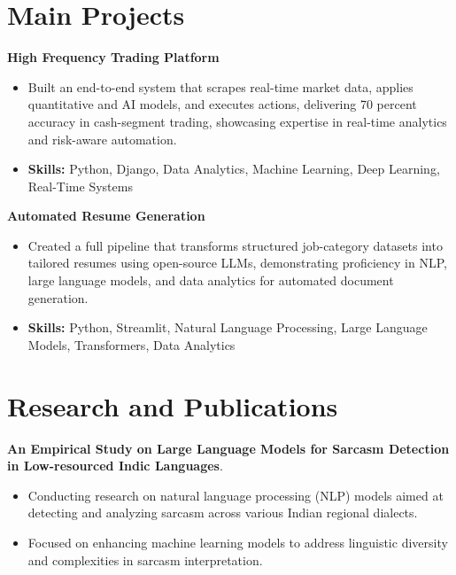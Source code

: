 \documentclass[a4paper,11pt]{article}
\begin{document}
\section{\textbf{Main Projects}}

\vspace{1mm}
  \textbf{High Frequency Trading Platform  }
\vspace{-1.5mm} %
\begin{itemize}
  \item Built an end-to-end system that scrapes real-time market data, applies quantitative and AI models, and executes actions, delivering 70 percent accuracy in cash-segment trading, showcasing expertise in real-time analytics and risk-aware automation.
\vspace{-3mm}
  \item \textbf{Skills:} Python, Django, Data Analytics, Machine Learning, Deep Learning, Real-Time Systems
\end{itemize}


\vspace{1mm}
   \textbf{Automated Resume Generation }
\vspace{-1.5mm} %
\begin{itemize}
  \item Created a full pipeline that transforms structured job-category datasets into tailored resumes using open-source LLMs, demonstrating proficiency in NLP, large language models, and data analytics for automated document generation.
\vspace{-3mm}
  \item \textbf{Skills:} Python, Streamlit, Natural Language Processing, Large Language Models, Transformers, Data Analytics
\end{itemize}



\section{\textbf{Research and Publications} \hfill }
\vspace{1mm}
  \textbf{An Empirical Study on Large Language Models for Sarcasm Detection in Low-resourced Indic Languages}.
\vspace{-1mm} %
\begin{itemize}
  \item Conducting research on natural language processing (NLP) models aimed at detecting and analyzing sarcasm across various Indian regional dialects.
\vspace{-3mm}
  \item Focused on enhancing machine learning models to address linguistic diversity and complexities in sarcasm interpretation.
\end{itemize}
\end{document}
